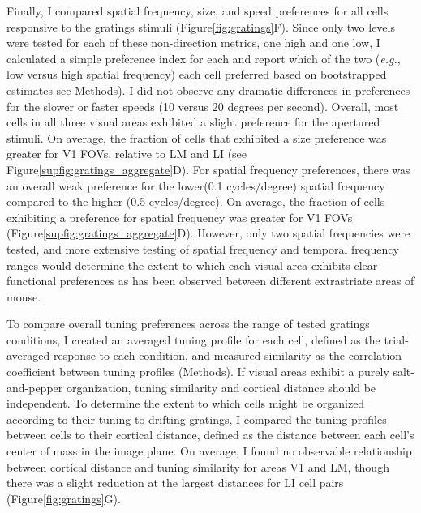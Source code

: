 
Finally, I compared spatial frequency, size, and speed preferences for all cells responsive to the gratings stimuli (Figure\ref{fig:gratings}F). Since only two levels were tested for each of these non-direction metrics, one high and one low, I calculated a simple preference index for each and report which of the two (\textit{e.g.}, low versus high spatial frequency) each cell preferred based on bootstrapped estimates see Methods). I did not observe any dramatic differences in preferences for the slower or faster speeds (10 versus 20 degrees per second). Overall, most cells in all three visual areas exhibited a slight preference for the apertured stimuli. On average, the fraction of cells that exhibited a size preference was greater for V1 FOVs, relative to LM and LI (see Figure\ref{supfig:gratings_aggregate}D). For spatial frequency preferences, there was an overall weak preference for the lower(0.1 cycles/degree) spatial frequency compared to the higher (0.5 cycles/degree). On average, the fraction of cells exhibiting a preference for spatial frequency was greater for V1 FOVs (Figure\ref{supfig:gratings_aggregate}D). However, only two spatial frequencies were tested, and more extensive testing of spatial frequency and temporal frequency ranges would determine the extent to which each visual area exhibits clear functional preferences as has been observed between different extrastriate areas of mouse\cite{Niell2008, Andermann2011, Marshel2011}. 


To compare overall tuning preferences across the range of tested gratings conditions, I created an averaged tuning profile for each cell, defined as the trial-averaged response to each condition, and measured similarity as the correlation coefficient between tuning profiles (Methods). If visual areas exhibit a purely salt-and-pepper organization, tuning similarity and cortical distance should be independent. To determine the extent to which cells might be organized according to their tuning to drifting gratings, I compared the tuning profiles between cells to their cortical distance, defined as the distance between each cell’s center of mass in the image plane. On average, I found no observable relationship between cortical distance and tuning similarity for areas V1 and LM, though there was a slight reduction at the largest distances for LI cell pairs (Figure\ref{fig:gratings}G). 


